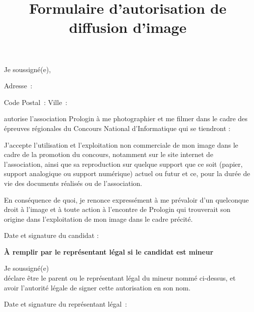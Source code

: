 \documentclass[a4paper,11pt]{prologin}
\title{Formulaire d'autorisation de diffusion d'image}
\begin{document}
Je soussigné(e), \dotfill

Adresse~: \dotfill

Code Postal~: \dotfill  Ville~: \dotfill

autorise l'association Prologin à me photographier et me filmer dans
le cadre des épreuves régionales du Concours National d'Informatique qui se
tiendront :

\small
{}
\normalsize

J'accepte l'utilisation et l'exploitation non commerciale de mon
image dans le cadre de la promotion du concours, notamment sur le site internet
de l'association, ainsi que sa reproduction sur quelque support que ce soit
(papier, support analogique ou support numérique) actuel ou futur et ce, pour la
durée de vie des documents réalisés ou de l'association.

En conséquence de quoi, je renonce expressément à me prévaloir d'un
quelconque droit à l'image et à toute action à l'encontre de Prologin qui
trouverait son origine dans l'exploitation de mon image dans le cadre précité.

Date et signature du candidat :\vspace\baselineskip

\textbf{À remplir par le représentant légal si le candidat est mineur}

Je soussigné(e) \dotfill\\
déclare être le parent ou le représentant légal du mineur nommé
ci-dessus, et avoir l'autorité légale de signer cette autorisation en son nom.

Date et signature du représentant légal~:
\end{document}
